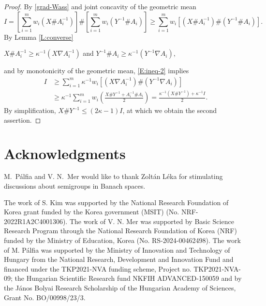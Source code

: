 \documentclass[12pt,reqno]{amsart}
\begin{document}
\begin{proof}
By \eqref{grad-Wass} and joint concavity of the geometric mean
\begin{equation} \label{E:ineq-2}
I = \left[ \sum_{i=1}^{m} w_{i} (X \# A_{i}^{-1}) \right] \# \left[ \sum_{i=1}^{m} w_{i} (Y^{-1} \# A_{i}) \right]
\geq \sum_{i=1}^{m} w_{i} \left[ (X \# A_{i}^{-1}) \# (Y^{-1} \# A_{i}) \right].
\end{equation}
By Lemma \ref{L:converse}
\begin{center}
$X \# A_{i}^{-1} \geq \kappa^{-1} (X \nabla A_{i}^{-1})$ \quad and \quad $Y^{-1} \# A_{i} \geq \kappa^{-1} (Y^{-1} \nabla A_{i})$,
\end{center}
and by monotonicity of the geometric mean, \eqref{E:ineq-2} implies
\begin{displaymath}
\begin{split}
I & \geq \sum_{i=1}^{m} \kappa^{-1} w_{i} \left[ (X \nabla A_{i}^{-1}) \# (Y^{-1} \nabla A_{i}) \right] \\
& \geq \kappa^{-1} \sum_{i=1}^{m} w_{i} \left( \frac{X \# Y^{-1} + A_{i}^{-1} \# A_{i}}{2} \right) = \frac{\kappa^{-1} (X \# Y^{-1}) + \kappa^{-1} I}{2}.
\end{split}
\end{displaymath}
By simplification, $\displaystyle X \# Y^{-1} \leq (2 \kappa - 1)I$, at which we obtain the second assertion.
\end{proof}


\section*{Acknowledgments}
M.~P\'alfia and V. N.~Mer would like to thank Zolt\'an L\'eka for stimulating discussions about semigroups in Banach spaces.

The work of S. Kim was supported by the National Research Foundation of Korea grant funded by the Korea government (MSIT) (No. NRF-2022R1A2C4001306). The work of V. N. Mer  was supported by Basic Science Research Program through the National Research Foundation of Korea (NRF) funded by the Ministry of Education, Korea (No. RS-2024-00462498). The work of M. P\'alfia was supported by the Ministry of Innovation and Technology of Hungary from the National Research, Development and Innovation Fund and financed under the TKP2021-NVA funding scheme, Project no. TKP2021-NVA-09; the Hungarian Scientific Research fund NKFIH ADVANCED-150059 and by the János Bolyai Research Scholarship of the Hungarian Academy of Sciences, Grant No. BO/00998/23/3.

%
\end{document}
